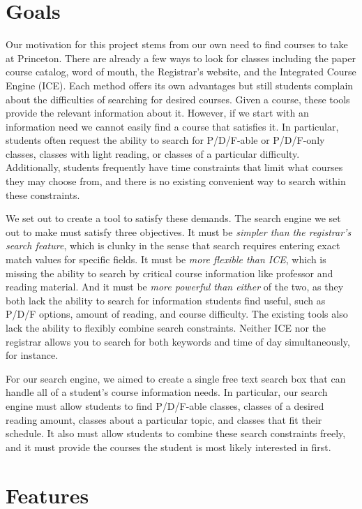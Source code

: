 \documentclass[12pt,letterpaper]{article}
\begin{document}
\section{Goals}
Our motivation for this project stems from our own need to find courses to take at Princeton. There are already a few ways to look for classes including the paper course catalog, word of mouth, the Registrar's website, and the Integrated Course Engine (ICE).
Each method offers its own advantages but still students complain about the difficulties of searching for desired courses. Given a course, these tools provide the relevant information about it. However, if we start with an information need we cannot easily find a course that satisfies it.
In particular, students often request the ability to search for P/D/F-able or P/D/F-only classes, classes with light reading, or classes of a particular difficulty. Additionally, students frequently have time constraints that limit what courses they may choose from, and there is no existing convenient way to search within these constraints.
	
We set out to create a tool to satisfy these demands. The search engine we set out to make must satisfy three objectives. It must be \emph{simpler than the registrar's search feature}, which is clunky in the sense that search requires entering exact match values for specific fields.
It must be \emph{more flexible than ICE}, which is missing the ability to search by critical course information like professor and reading material. And it must be \emph{more powerful than either} of the two, as they both lack the ability to search for information students find useful, such as P/D/F options, amount of reading, and course difficulty.
The existing tools also lack the ability to flexibly combine search constraints. Neither ICE nor the registrar allows you to search for both keywords and time of day simultaneously, for instance.
	
For our search engine, we aimed to create a single free text search box that can handle all of a student's course information needs. In particular, our search engine must allow students to find P/D/F-able classes, classes of a desired reading amount, classes about a particular topic, and classes that fit their schedule.
It also must allow students to combine these search constraints freely, and it must provide the courses the student is most likely interested in first.
	
\section{Features}
\end{document}
